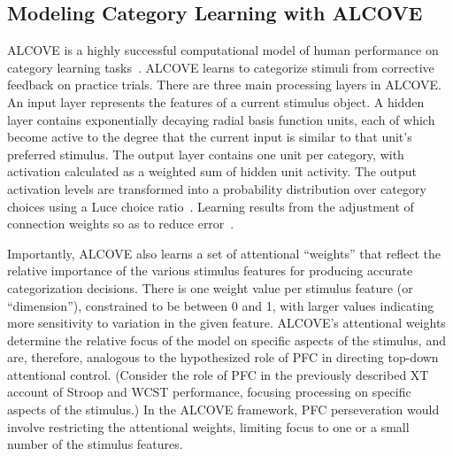 
\subsection{Modeling Category Learning with ALCOVE}
ALCOVE is a highly successful computational model of human performance on category learning tasks~\cite{RefWorks:114}. ALCOVE learns to categorize stimuli from corrective feedback on practice trials. There are three main processing layers in ALCOVE. An input layer represents the features of a current stimulus object. A hidden layer contains exponentially decaying radial basis function units, each of which become active to the degree that the current input is similar to that unit's preferred stimulus. The output layer contains one unit per category, with activation calculated as a weighted sum of hidden unit activity. The output activation levels are transformed into a probability distribution over category choices using a Luce choice ratio~\cite{Luce:1963}. Learning results from the adjustment of connection weights so as to reduce error~\cite{RefWorks:114}.

Importantly, ALCOVE also learns a set of attentional ``weights'' that reflect the relative importance of the various stimulus features for producing accurate categorization decisions. There is one weight value per stimulus feature (or ``dimension''), constrained to be between 0 and 1, with larger values indicating more sensitivity to variation in the given feature. ALCOVE's attentional weights determine the relative focus of the model on specific aspects of the stimulus, and are, therefore, analogous to the hypothesized role of PFC in directing top-down attentional control. (Consider the role of PFC in the previously described XT account of Stroop and WCST performance, focusing processing on specific aspects of the stimulus.) In the ALCOVE framework, PFC perseveration would involve restricting the attentional weights, limiting focus to one or a small number of the stimulus features.  

